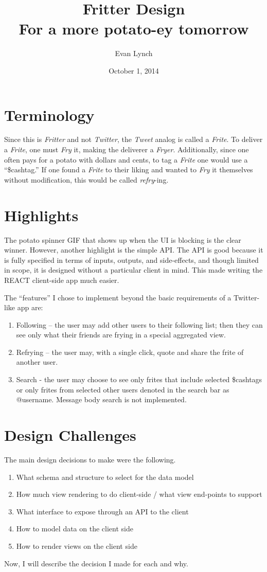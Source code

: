 \documentclass{amsart}
\title{Fritter Design \\ For a more potato-ey tomorrow}
\author{Evan Lynch}
\date{October 1, 2014}
\begin{document}
\maketitle
\section{Terminology}
Since this is \emph{Fritter} and not \emph{Twitter}, the \emph{Tweet} analog is
called a  \emph{Frite}. To deliver a \emph{Frite},
one must \emph{Fry} it, making the deliverer a \emph{Fryer}. Additionally, since one often
pays for a potato with dollars and cents, to tag a \emph{Frite} one would use a 
``\$cashtag.'' If one found a \emph{Frite} to their liking and wanted to \emph{Fry} it
themselves without modification, this would be called \emph{refry}-ing.

\section{Highlights}
\label{sec:subtitle}
The potato spinner GIF that shows up when the UI is blocking is the clear winner. However, another
highlight is the simple API. The API is good because it is fully specified in terms of inputs, outputs, and side-effects, and though limited in scope, it is designed without a particular client in mind. This made
writing the REACT client-side app much easier.

The ``features'' I chose to implement beyond the basic requirements of a Twitter-like app are:
\begin{enumerate}
\item Following -- the user may add other users to their following list; then they can see only what their friends are frying in a special aggregated view.
\item Refrying -- the user may, with a single click, quote and share the frite of another user.
\item Search - the user may choose to see only frites that include selected \$cashtags or only frites from selected other users denoted in the search bar as @username. Message body search is not implemented.
\end{enumerate}

\section{Design Challenges}
\label{sec:another_subtitle}
The main design decisions to make were the following.
\begin{enumerate}
\item What schema and structure to select for the data model
\item How much view rendering to do client-side / what view end-points to support
\item What interface to expose through an API to the client
\item How to model data on the client side
\item How to render views on the client side
\end{enumerate}
Now, I will describe the decision I made for each and why.
\end{document}
